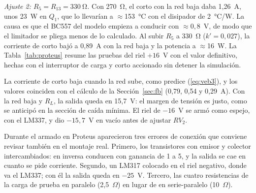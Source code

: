 \documentclass[conference]{IEEEtran}
\begin{document}
\textit{Ajuste 2: $R_5=R_{13}=\SI{330}{\ohm}$.} Con \SI{270}{\ohm}, el corto con la red baja daba 1,26~A, unos 23~W en $Q_1$, que lo llevarían a $\approx$153~°C con el disipador de 2~°C/W. La causa es que el BC557 del modelo empieza a conducir con $\approx0{,}8$~V, de modo que el limitador se pliega menos de lo calculado. Al subir $R_5$ a \SI{330}{\ohm} ($k'=0{,}027$), la corriente de corto bajó a 0,89~A con la red baja y la potencia a $\approx$16~W. La Tabla~\ref{tab:proteus} resume las pruebas del riel $+16$~V con el valor definitivo, hechas con el interruptor de carga y corto accionado sin detener la simulación.

\begin{table}[htbp]
\caption{Riel +16~V en Proteus ($R_5=\SI{330}{\ohm}$, transformador de 5~A)}
\label{tab:proteus}
\centering
\scriptsize\setlength{\tabcolsep}{3pt}
\end{table}

La corriente de corto baja cuando la red sube, como predice (\ref{eq:veb3}), y los valores coinciden con el cálculo de la Sección~\ref{sec:fb} (0,79, 0,54 y 0,29~A). Con la red baja y $R_L$, la salida queda en 15,7~V: el margen de tensión es justo, como se anticipó en la sección de caída mínima. El riel de $-16$~V se armó como espejo, con el LM337, y dio $-15{,}7$~V en vacío antes de ajustar $RV_2$.

Durante el armado en Proteus aparecieron tres errores de conexión que conviene revisar también en el montaje real. Primero, los transistores con emisor y colector intercambiados: en inversa conducen con ganancia de 1 a 5, y la salida se cae en cuanto se pide corriente. Segundo, un LM317 colocado en el riel negativo, donde va el LM337; con él la salida queda en $-25$~V. Tercero, las cuatro resistencias de la carga de prueba en paralelo (2,5~$\Omega$) en lugar de en serie-paralelo (10~$\Omega$).
\end{document}
